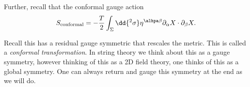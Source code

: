 
Further, recall that the conformal gauge action
\begin{align}
    S_\text{conformal} = -\frac{T}{2} \int_{\Sigma} \dd{^2 \sigma} \eta^{\alhpa \beta} \partial_\alpha X   \cdot  \partial_\beta X
.\end{align}

Recall this has a residual gauge symmetric that rescales the metric. This is called a \emph{conformal transformation}. In string theory we think about this as a gauge symmetry, however thinking of this as a 2D field theory, one thinks of this as a global symmetry. One can always return and gauge this symmetry at the end as we will do.



